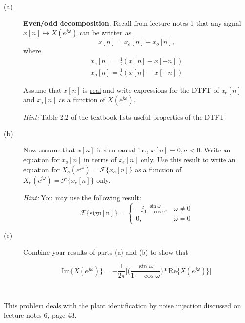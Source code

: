 \documentclass[12pt]{report}
\begin{document}
\begin{description}
	\item[(a)] \textbf{Even/odd decomposition}. Recall from lecture notes 1 that any signal $x[n] \leftrightarrow X(e^{j\omega})$ can be written as
	\begin{equation}
	x[n] = x_e[n] + x_o[n],
	\end{equation}
	where 
	\begin{align}
	x_e[n] = \frac{1}{2}(x[n] + x[-n]) \tag{even symmetric: $x_e[n] = x_e[-n]$} \\
	x_o[n] = \frac{1}{2}(x[n] - x[-n]) \tag{odd symmetric: $x_o[n] = -x_o[-n]$}
	\end{align}
	
	Assume that $x[n]$ is \underline{real} and write expressions for the DTFT of $x_e[n]$ and $x_o[n]$ as a function of $X(e^{j\omega})$.
	
	\textit{Hint:} Table 2.2 of the textbook lists useful properties of the DTFT.
	
	\item[(b)] Now assume that $x[n]$ is also \underline{causal} i.e., $x[n] = 0, n < 0$. Write an equation for $x_o[n]$ in terms of $x_e[n]$ only. Use this result to write an equation for $X_o(e^{j\omega}) = \mathcal{F}\{x_o[n]\}$ as a function of $X_e(e^{j\omega})=\mathcal{F}\{x_e[n]\}$ only.
	
	\textit{Hint:} You may use the following result:
	\begin{equation}
	\mathcal{F}\{\mathrm{sign[n]}\} = \begin{cases}
	-j\displaystyle\frac{\sin\omega}{1-\cos\omega}, &\omega\neq 0 \\
	0, &\omega = 0
	\end{cases}
	\end{equation} 
	
	\item[(c)] Combine your results of parts (a) and (b) to show that 
	
	\begin{equation}
	\mathrm{Im}\{X(e^{j\omega})\} = -\frac{1}{2\pi}\bigg[\Big(\frac{\sin\omega}{1-\cos\omega}\Big)\ast \mathrm{Re}\{X(e^{j\omega})\}\bigg]
	\end{equation}
\end{description} 


\mbox{}\\

This problem deals with the plant identification by noise injection discussed on lecture notes 6, page 43. 
\end{document}
